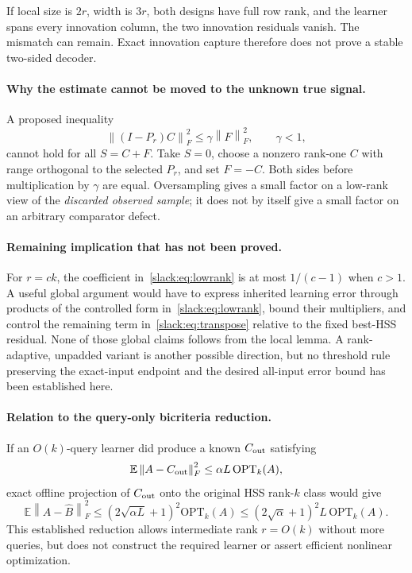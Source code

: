 \documentclass[11pt,oneside,openany,a4paper]{book}
\numberwithin{equation}{chapter}
\theoremstyle{definition}
\theoremstyle{remark}
\newcommand{\F}[1]{\left\lVert#1\right\rVert_F}
\begin{document}
If local size is $2r$, width is $3r$, both designs have full row rank, and the learner spans every innovation column, the two innovation residuals vanish. The mismatch can remain. Exact innovation capture therefore does not prove a stable two-sided decoder.

\paragraph{Why the estimate cannot be moved to the unknown true signal.}
A proposed inequality
\[
 \F{(I-P_r)C}^2\le\gamma\F F^2,\qquad \gamma<1,
\]
cannot hold for all $S=C+F$. Take $S=0$, choose a nonzero rank-one $C$ with range orthogonal to the selected $P_r$, and set $F=-C$. Both sides before multiplication by $\gamma$ are equal. Oversampling gives a small factor on a low-rank view of the \emph{discarded observed sample}; it does not by itself give a small factor on an arbitrary comparator defect.

\paragraph{Remaining implication that has not been proved.}
For $r=ck$, the coefficient in~\eqref{slack:eq:lowrank} is at most $1/(c-1)$ when $c>1$. A useful global argument would have to express inherited learning error through products of the controlled form in~\eqref{slack:eq:lowrank}, bound their multipliers, and control the remaining term in~\eqref{slack:eq:transpose} relative to the fixed best-HSS residual. None of those global claims follows from the local lemma. A rank-adaptive, unpadded variant is another possible direction, but no threshold rule preserving the exact-input endpoint and the desired all-input error bound has been established here.

\paragraph{Relation to the query-only bicriteria reduction.}
If an $O(k)$-query learner did produce a known $C_{\rm out}$ satisfying
\[
 \mathbb E\F{A-C_{\rm out}}^2\le\alpha L\,\mathrm{OPT}_k(A),
\]
exact offline projection of $C_{\rm out}$ onto the original HSS rank-$k$ class would give
\[
 \mathbb E\F{A-\widehat B}^2
 \le(2\sqrt{\alpha L}+1)^2\mathrm{OPT}_k(A)
 \le(2\sqrt\alpha+1)^2L\,\mathrm{OPT}_k(A).
\]
This established reduction allows intermediate rank $r=O(k)$ without more queries, but does not construct the required learner or assert efficient nonlinear optimization.
\end{document}
